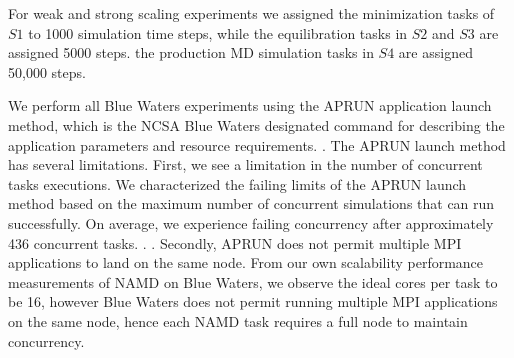 For weak and strong scaling experiments we assigned the minimization tasks 
of $S1$ to 1000 simulation time steps, while the equilibration
tasks in $S2$ and $S3$ are assigned 5000 steps. the production MD simulation 
tasks  in $S4$ are assigned 50,000 
steps. 



We perform  all Blue Waters
experiments using the APRUN application launch method, which is the NCSA Blue Waters designated command for describing the application parameters and 
resource requirements.  . The APRUN launch method has several  limitations. First, we see a limitation in the number of concurrent tasks 
executions. We characterized the failing limits of the APRUN launch method based 
on the maximum number of concurrent simulations that can run successfully. On 
average, we experience failing concurrency after approximately 436 concurrent tasks. . . Secondly, APRUN does not permit multiple MPI applications to land
on the same node. From our own scalability performance measurements of NAMD on
Blue Waters, we observe the ideal cores per task to be 16, however Blue
Waters does not permit running multiple MPI applications on the same node,
hence each NAMD task requires a full node to maintain concurrency.




